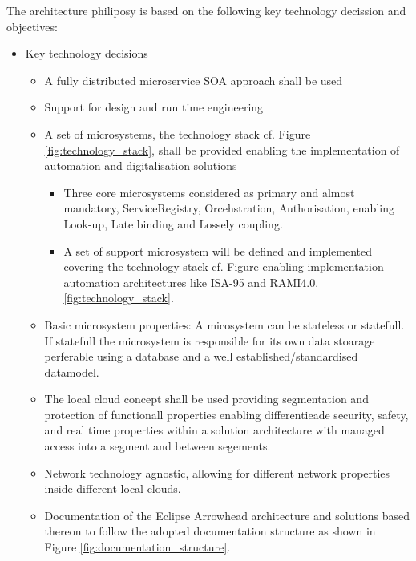 \documentclass[a4paper]{arrowhead}
\begin{document}
The architecture philiposy is based on the following key technology
decission and objectives:
\begin{itemize}
\item Key technology decisions
  \begin{itemize}
  \item A fully distributed microservice SOA approach shall be used
  \item Support for design and run time engineering

  \item A set of microsystems, the technology stack cf. Figure
    \ref{fig:technology_stack}, shall be provided enabling the
    implementation of automation and digitalisation solutions
    
    \begin{itemize}
    \item Three core microsystems considered as primary and almost
      mandatory, ServiceRegistry, Orcehstration, Authorisation,
      enabling Look-up, Late binding and Lossely coupling.
    \item A set of support microsystem will be defined and implemented
      covering the technology stack cf. Figure enabling implementation
      automation architectures like ISA-95 and RAMI4.0. 
      \ref{fig:technology_stack}.
      \end{itemize}

    \item Basic microsystem properties: A micosystem can be stateless
      or statefull. If statefull the microsystem is responsible for
      its own data stoarage perferable using a database and a well
      established/standardised datamodel.

    \item The local cloud concept shall be used providing segmentation
      and protection of functionall properties enabling differentieade
      security, safety, and real time properties within a solution
      architecture with managed access into a segment and between segements.

    \item Network technology agnostic, allowing for different network
      properties inside different local clouds.

    \item Documentation of the Eclipse Arrowhead architecture and
      solutions based thereon to follow the adopted documentation
      structure as shown in Figure \ref{fig:documentation_structure}.  
  

\end{itemize}
\end{itemize}
\end{document}
